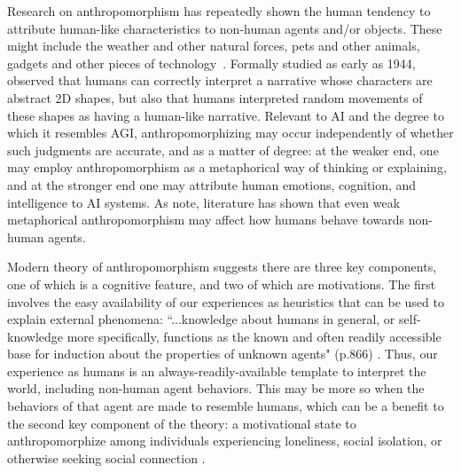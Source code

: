 \documentclass{article}
\theoremstyle{plain}
\theoremstyle{definition}
\theoremstyle{remark}
\begin{document}
Research on anthropomorphism has repeatedly shown the human tendency to attribute human-like characteristics to non-human agents and/or objects. These might include the weather and other natural forces, pets and other animals, gadgets and other pieces of technology~\cite{epley2007seeing}. Formally studied as early as 1944,~\cite{heider1944experimental} observed that humans can correctly interpret a narrative whose characters are abstract 2D shapes, but also that humans interpreted random movements of these shapes as having a human-like narrative. 
Relevant to AI and the degree to which it resembles AGI, anthropomorphizing may occur independently of whether such judgments are accurate, and as a matter of degree: at the weaker end, one may employ anthropomorphism as a metaphorical way of thinking or explaining, and at the stronger end one may attribute human emotions, cognition, and intelligence to AI systems. As \citet{epley2007seeing} note, literature has shown that even weak metaphorical anthropomorphism may affect how humans behave towards non-human agents.

Modern theory of anthropomorphism suggests there are three key components, one of which is a cognitive feature, and two of which are motivations. The first involves the easy availability of our experiences as heuristics that can be used to explain external phenomena: ``...knowledge about humans in general, or self-knowledge more specifically, functions as the known and often readily accessible base for induction about the properties of unknown agents" (p.866) \cite{epley2007seeing, waytz2010social}. Thus, our experience as humans is an always-readily-available template to interpret the world, including non-human agent behaviors. This may be more so when the behaviors of that agent are made to resemble humans, which can be a benefit to the second key component of the theory: a motivational state to anthropomorphize among individuals experiencing loneliness, social isolation, or otherwise seeking social connection \cite{epley2007seeing, waytz2010social}. 
\end{document}
